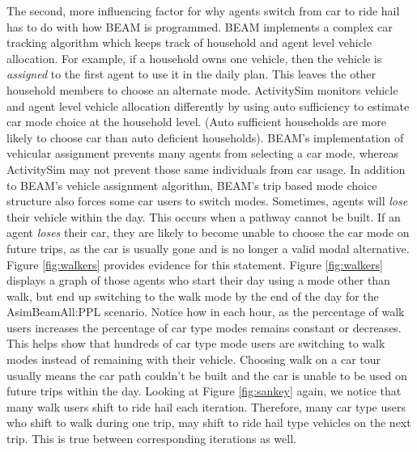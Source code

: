 \documentclass[12pt, oneside, openright]{byuthesis}
\begin{document}
The second, more influencing factor for why agents switch from car to ride hail has to do with how BEAM is programmed. BEAM implements a complex car tracking algorithm which keeps track of household and agent level vehicle allocation. For example, if a household owns one vehicle, then the vehicle is \emph{assigned} to the first agent to use it in the daily plan. This leaves the other household members to choose an alternate mode. ActivitySim monitors vehicle and agent level vehicle allocation differently by using auto sufficiency to estimate car mode choice at the household level. (Auto sufficient households are more likely to choose car than auto deficient households). BEAM's implementation of vehicular assignment prevents many agents from selecting a car mode, whereas ActivitySim may not prevent those same individuals from car usage. In addition to BEAM's vehicle assignment algorithm, BEAM's trip based mode choice structure also forces some car users to switch modes. Sometimes, agents will \emph{lose} their vehicle within the day. This occurs when a pathway cannot be built. If an agent \emph{loses} their car, they are likely to become unable to choose the car mode on future trips, as the car is usually gone and is no longer a valid modal alternative. Figure \ref{fig:walkers} provides evidence for this statement. Figure \ref{fig:walkers} displays a graph of those agents who start their day using a mode other than walk, but end up switching to the walk mode by the end of the day for the AsimBeamAll:PPL scenario. Notice how in each hour, as the percentage of walk users increases the percentage of car type modes remains constant or decreases. This helps show that hundreds of car type mode users are switching to walk modes instead of remaining with their vehicle. Choosing walk on a car tour usually means the car path couldn't be built and the car is unable to be used on future trips within the day. Looking at Figure \ref{fig:sankey} again, we notice that many walk users shift to ride hail each iteration. Therefore, many car type users who shift to walk during one trip, may shift to ride hail type vehicles on the next trip. This is true between corresponding iterations as well.
\end{document}
